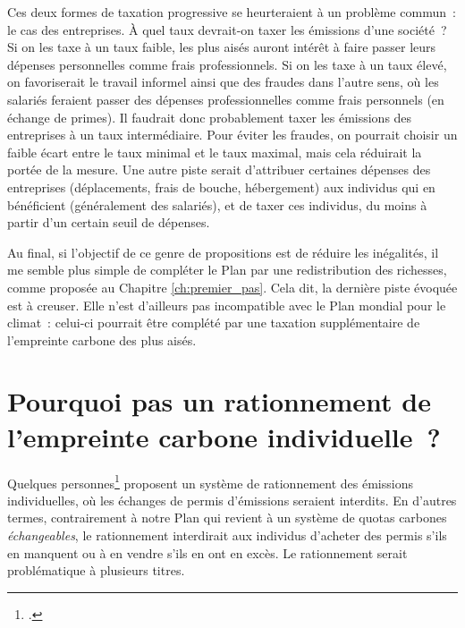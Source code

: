 \documentclass[a5paper,french,openany]{memoir}
\begin{document}
Ces deux formes de taxation progressive se heurteraient à un problème commun~: le cas des entreprises. À quel taux devrait-on taxer les émissions d'une société~? Si on les taxe à un taux faible, les plus aisés auront intérêt à faire passer leurs dépenses personnelles comme frais professionnels. Si on les taxe à un taux élevé, on favoriserait le travail informel ainsi que des fraudes dans l'autre sens, où les salariés feraient passer des dépenses professionnelles comme frais personnels (en échange de primes). Il faudrait donc probablement taxer les émissions des entreprises à un taux intermédiaire. Pour éviter les fraudes, on pourrait choisir un faible écart entre le taux minimal et le taux maximal, mais cela réduirait la portée de la mesure. Une autre piste serait d'attribuer certaines dépenses des entreprises (déplacements, frais de bouche, hébergement) aux individus qui en bénéficient (généralement des salariés), et de taxer ces individus, du moins à partir d'un certain seuil de dépenses. 

Au final, si l'objectif de ce genre de propositions est de réduire les inégalités, il me semble plus simple de compléter le Plan par une redistribution des richesses, comme proposée au Chapitre \ref{ch:premier_pas}. Cela dit, la dernière piste évoquée est à creuser. Elle n'est d'ailleurs pas incompatible avec le Plan mondial pour le climat~: celui-ci pourrait être complété par une taxation supplémentaire de l'empreinte carbone des plus aisés. 

\section*{\normalsize Pourquoi pas un rationnement de l'empreinte carbone individuelle~?}\label{q:rationnement}

Quelques %
personnes\footnote{\cite{wood_rationing_2023}.} proposent un système de rationnement des émissions individuelles, où les échanges de permis d'émissions seraient interdits. En d'autres termes, contrairement à notre Plan qui revient à un système de quotas carbones \textit{échangeables}, le rationnement interdirait aux individus d'acheter des permis s'ils en manquent ou à en vendre s'ils en ont en excès. %
Le rationnement serait problématique à plusieurs titres. 
\end{document}

